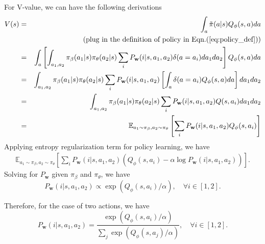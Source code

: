 \documentclass{article}
\begin{document}
For V-value, we can have the following derivations
\begin{eqnarray}
	V(s)&=&\int_a \tilde{\pi}(a|s)Q_{\phi}(s,a)da\\
	&&\text{(plug in the definition of policy in Eqn.(\ref{eq:policy_def}))}\\
	&=&\int_a \left[ \int_{a_1,a_2}\pi_{\beta}(a_1|s)\pi_{\theta}(a_2|s)\sum_i P_{\mathbf{w}}(i|s,a_1,a_2)\delta(a=a_i)da_1da_2\right]Q_{\phi}(s,a)da\\
	&=&\int_{a_1,a_2}\pi_{\beta}(a_1|s)\pi_{\theta}(a_2|s)\sum_i P_{\mathbf{w}}(i|s,a_1,a_2)\left[\int_a\delta(a=a_i)Q_{\phi}(s,a)da\right]da_1da_2\\
	&=&\int_{a_1,a_2}\pi_{\beta}(a_1|s)\pi_{\theta}(a_2|s)\sum_i P_{\mathbf{w}}(i|s,a_1,a_2)Q(s,a_i)da_1da_2\\
	&=&\mathbb{E}_{a_1\sim\pi_{\beta},a_2\sim\pi_{\theta}}\left[\sum_i P_{\mathbf{w}}(i|s,a_1,a_2)Q_{\phi}(s,a_i) \right ]
\end{eqnarray}
Applying entropy regularization term for policy learning, we have
\begin{eqnarray}
\mathbb{E}_{a_1\sim\pi_{\beta},a_2\sim\pi_{\theta}}\left[\sum_i P_{\mathbf{w}}(i|s,a_1,a_2)\left(Q_{\phi}(s,a_i) -\alpha \log P_{\mathbf{w}}(i|s,a_1,a_2)\right) \right ].
\end{eqnarray}
Solving for $P_{\mathbf{w}}$ given $\pi_{\beta}$ and $\pi_{\theta}$, we have
\begin{equation}
	P_{\mathbf{w}}(i|s,a_1,a_2)\propto \exp(Q_{\phi}(s,a_i)/\alpha), \quad \forall i \in [1, 2].
\end{equation}

Therefore, for the case of two actions, we have
\begin{equation}
	P_{\mathbf{w}}(i|s,a_1,a_2) = \frac{\exp (Q_{\phi}(s, a_i)/\alpha)}{\sum_j \exp (Q_{\phi}(s, a_j)/\alpha)}, \quad \forall i \in [1, 2].
\end{equation}
\end{document}
